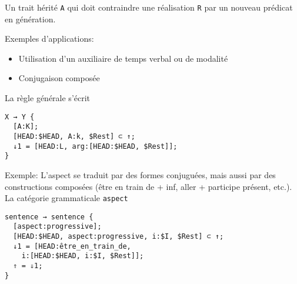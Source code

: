 \documentclass[11pt]{article}
\begin{document}
Un trait hérité \texttt{A} qui doit contraindre une réalisation
\texttt{R} par un nouveau prédicat en génération.

Exemples d'applications:
\begin{itemize}
\item Utilisation d'un auxiliaire de temps verbal ou de modalité
\item Conjugaison composée 
\end{itemize}

La règle générale s'écrit

\begin{lstlisting}
X → Y {
  [A:K];
  [HEAD:$HEAD, A:k, $Rest] ⊂ ↑;
  ↓1 = [HEAD:L, arg:[HEAD:$HEAD, $Rest]];
}

\end{lstlisting}

Exemple:
L'aspect se traduit par des formes conjuguées, mais aussi par des
constructions composées (\og être en train de + inf\fg{}, \og aller +
participe présent\fg{}, etc.). La catégorie grammaticale \texttt{aspect} 

\begin{lstlisting}
sentence → sentence {
  [aspect:progressive];
  [HEAD:$HEAD, aspect:progressive, i:$I, $Rest] ⊂ ↑;
  ↓1 = [HEAD:être_en_train_de, 
	i:[HEAD:$HEAD, i:$I, $Rest]];
  ⇑ = ⇓1;
}

\end{lstlisting}
\end{document}
